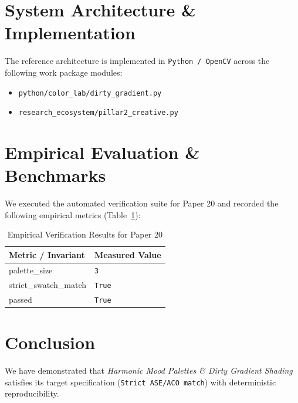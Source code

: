 \documentclass[10pt,twocolumn]{article}
\begin{document}
\section{System Architecture \& Implementation}
The reference architecture is implemented in \texttt{Python / OpenCV} across the following work package modules:
\begin{itemize}
  \item \texttt{python/color\_lab/dirty\_gradient.py}
  \item \texttt{research\_ecosystem/pillar2\_creative.py}
\end{itemize}

\section{Empirical Evaluation \& Benchmarks}
We executed the automated verification suite for Paper 20 and recorded the following empirical metrics (Table~\ref{tab:metrics}):

\begin{table}[htbp]
\centering
\caption{Empirical Verification Results for Paper 20}
\label{tab:metrics}
\begin{tabular}{ll}
\toprule
\textbf{Metric / Invariant} & \textbf{Measured Value} \\
\midrule
    palette\_size & \texttt{3} \\
    strict\_swatch\_match & \texttt{True} \\
    passed & \texttt{True} \\
\bottomrule
\end{tabular}
\end{table}

\section{Conclusion}
We have demonstrated that \textit{Harmonic Mood Palettes \& Dirty Gradient Shading} satisfies its target specification (\texttt{Strict ASE/ACO match}) with deterministic reproducibility.



\end{document}
